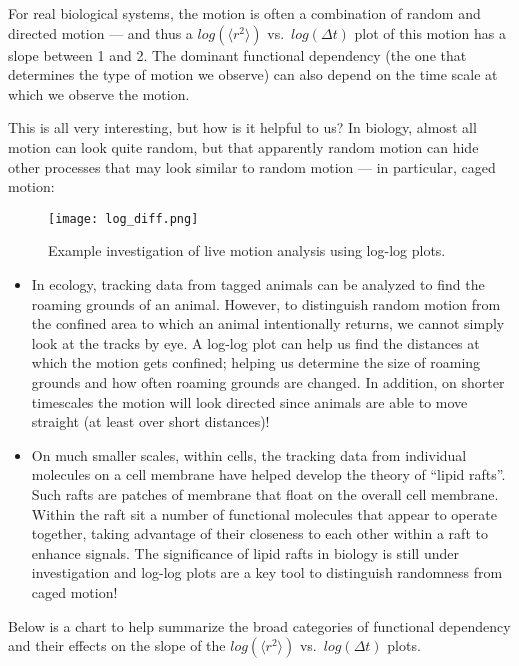  \par
For real biological systems, the motion is often a combination of random and directed motion — and thus a $log(\langle r^{2} \rangle)$ vs.\ $log(\Delta t)$ plot of this motion has a slope between 1 and 2. 
The dominant functional dependency (the one that determines the type of motion we observe) can also depend on the time scale at which we observe the motion.
\par
This is all very interesting, but how is it helpful to us?
In biology, almost all motion can look quite random, but that apparently random motion can hide other processes that may look similar to random motion — in particular, caged motion:

\begin{figure}[h!]
	\centering
	\texttt{[image: log\_diff.png]}
	\caption{Example investigation of live motion analysis using log-log plots.}
	\label{fig:log-diff}
\end{figure}

\begin{itemize}
\item In ecology, tracking data from tagged animals can be analyzed to find the roaming grounds of an animal.
However, to distinguish random motion from the confined area to which an animal intentionally returns, we cannot simply look at the tracks by eye.
A log-log plot can help us find the distances at which the motion gets confined; helping us determine the size of roaming grounds and how often roaming grounds are changed.
In addition, on shorter timescales the motion will look directed since animals are able to move straight (at least over short distances)!
\item On much smaller scales, within cells, the tracking data from individual molecules on a cell membrane have helped develop the theory of ``lipid rafts''. Such rafts are patches of membrane that float on the overall cell membrane. Within the raft sit a number of functional molecules that appear to operate together, taking advantage of their closeness to each other within a raft to enhance signals. The significance of lipid rafts in biology is still under investigation and log-log plots are a key tool to distinguish randomness from caged motion!
\end{itemize}
%
Below is a chart to help summarize the broad categories of functional dependency and their effects on the slope of the $log(\langle r^{2} \rangle)$ vs.\ $log(\Delta t)$ plots.

